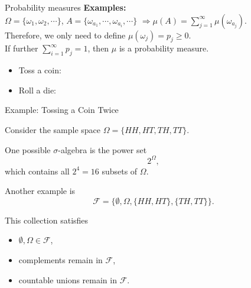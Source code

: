 \documentclass [aspectratio=169]{beamer}
\begin{document}
\begin{frame}{Probability measures}
\textbf{Examples:}\\
\vspace{0.1in}
$\Omega = \{\omega_1, \omega_2, \cdots\}$, $A = \{\omega_{a_1}, \cdots, \omega_{a_i}, \cdots\}$ $\Rightarrow \mu(A) = \sum_{j = 1}^\infty \mu(\omega_{a_j})$.\\
Therefore, we only need to define $\mu(\omega_j) = p_j \ge 0$. \\
If further $\sum_{i = 1}^\infty p_j = 1$, then $\mu$ is a probability measure. 
\vspace{0.1in}
\begin{itemize}
    \item Toss a coin: \\
    \vspace{0.5in}
    \item Roll a die: 
    \vspace{0.5in}
\end{itemize}
\end{frame}

\begin{frame}{Example: Tossing a Coin Twice}

Consider the sample space $\Omega=\{HH,HT,TH,TT\}$. \vspace{2mm}

One possible $\sigma$-algebra is the power set
\[
    2^\Omega,
\]
which contains all $2^4=16$ subsets of $\Omega$.

\vspace{2mm}

Another example is
\[
\mathcal F=
\{
\emptyset,
\Omega,
\{HH,HT\},
\{TH,TT\}
\}.
\]

This collection satisfies

\begin{itemize}
    \item $\emptyset,\Omega\in\mathcal F$,
    \item complements remain in $\mathcal F$,
    \item countable unions remain in $\mathcal F$.
\end{itemize}

\end{frame}
\end{document}
